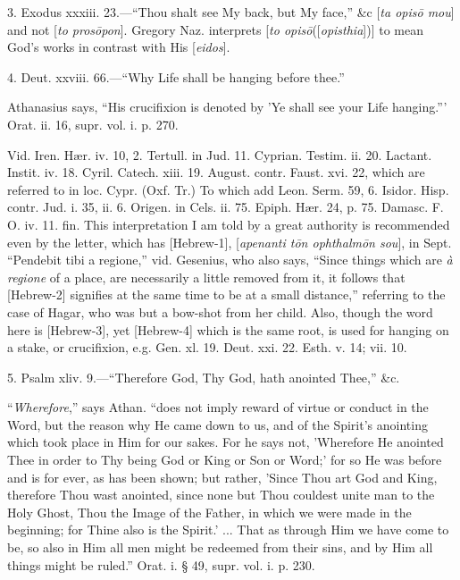 3. Exodus xxxiii. 23.—``Thou shalt see My back,
but My face,'' \&c [\emph{ta opis\={o} mou}] and not [\emph{to pros\={o}pon}].
Gregory Naz. interprets [\emph{to opis\={o}}([\emph{opisthia}])]
to mean God's works in contrast with His [\emph{eidos}].

4. Deut. xxviii. 66.—``Why Life shall be hanging
before thee.''

Athanasius says, ``His crucifixion is denoted by
'Ye shall see your Life hanging.''' Orat. ii. 16, supr. vol. i. p.
270.

Vid. Iren. Hær. iv. 10, 2. Tertull. in Jud. 11.
Cyprian. Testim. ii. 20. Lactant. Instit. iv. 18. Cyril. Catech. xiii.
19. August. contr. Faust. xvi. 22, which are referred to in loc. Cypr.
(Oxf. Tr.) To which add Leon. Serm. 59, 6. Isidor. Hisp. contr. Jud. i.
35, ii. 6. Origen. in Cels. ii. 75. Epiph. Hær. 24, p. 75. Damasc. F.
O. iv. 11. fin. This interpretation I am told by a great authority is
recommended even by the letter, which has [Hebrew-1],
[\emph{apenanti t\={o}n ophthalm\={o}n sou}], in Sept. ``Pendebit
tibi a regione,'' vid. Gesenius, who also says, ``Since things which are
\emph{à regione} of a place, are necessarily a little removed from
it, it follows that [Hebrew-2]
signifies at the same time to be at a small distance,'' referring to
the case of Hagar, who was but a bow-shot from her child. Also, though
the word here is [Hebrew-3],
yet [Hebrew-4]
which is the same root, is used for hanging on a stake, or
crucifixion, e.g. Gen. xl. 19. Deut. xxi. 22. Esth. v. 14; vii. 10.

5. Psalm xliv. 9.—``Therefore God, Thy God, hath
anointed Thee,'' \&c.

``\emph{Wherefore},'' says Athan. ``does not imply
reward of virtue or conduct in the Word, but the reason why He came
down to us, and of the Spirit's anointing which took place in Him for
our sakes. For he says not, 'Wherefore He anointed Thee in order to
Thy being God or King or Son or Word;' for so He was before and is for
ever, as has been shown; but rather, 'Since Thou art God and King,
therefore Thou wast anointed, since none but Thou couldest unite man
to the Holy Ghost, Thou the Image of the Father, in which we were made
in the beginning; for Thine also is the Spirit.' ... That as through
Him we have come to be, so also in Him all men might be redeemed from
their sins, and by Him all things might be ruled.'' Orat. i. § 49,
supr. vol. i. p. 230.

